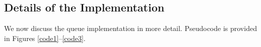 \subsection{Details of the Implementation}

We now discuss the queue implementation in more detail.  Pseudocode is provided in Figures \ref{code1}--\ref{code3}.

\renewcommand{\algorithmiccomment}[1]{\hfill\eqparbox{COMMENTDOUBLE}{\com\ #1}}

